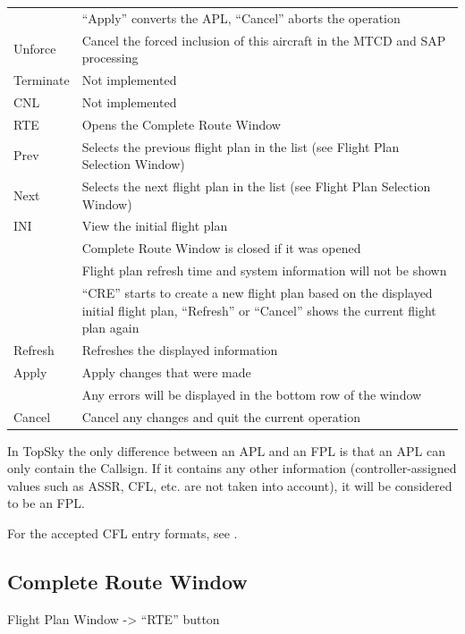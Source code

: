 \documentclass[a4paper,oneside,11pt]{memoir}
\newcommand{\winref}[1]{\textit{\titleref{#1}}}
\begin{document}
\begin{longtable}{p{1.5cm} p{11cm}}
                & “Apply” converts the APL, “Cancel” aborts the operation\\
    Unforce     & Cancel the forced inclusion of this aircraft in the MTCD and SAP processing\\
    Terminate   & Not implemented\\
    CNL         & Not implemented\\
    RTE         & Opens the Complete Route Window\\
    Prev        & Selects the previous flight plan in the list (see Flight Plan Selection Window)\\
    Next        & Selects the next flight plan in the list (see Flight Plan Selection Window)\\
    INI         & View the initial flight plan\\
                & Complete Route Window is closed if it was opened\\
                & Flight plan refresh time and system information will not be shown\\
                & “CRE” starts to create a new flight plan based on the displayed initial flight plan, “Refresh” or “Cancel” shows the current flight plan again\\
    Refresh     & Refreshes the displayed information\\
    Apply       & Apply changes that were made\\
                & Any errors will be displayed in the bottom row of the window\\
    Cancel      & Cancel any changes and quit the current operation\\
\end{longtable}

\bigskip

In TopSky the only difference between an APL and an FPL is that an APL can only contain the Callsign. If it contains any other information (controller-assigned values such as ASSR, CFL, etc. are not taken into account), it will be considered to be an FPL.

\bigskip

For the accepted CFL entry formats, see \winref{menu:afl}.

\subsection{Complete Route Window}
\label{win:crw}

Flight Plan Window -> “RTE” button
\end{document}
